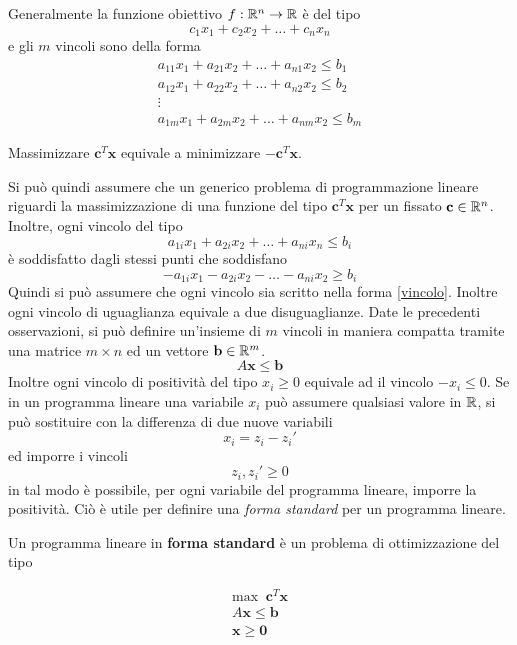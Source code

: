 \documentclass[10pt, letterpaper]{report}
\begin{document}
Generalmente la funzione obiettivo  $f:{\mathbb R}^n\rightarrow {\mathbb R}$ è del tipo 
$$c_1x_1+c_2x_2+\dots+c_nx_n $$
e gli $m$ vincoli sono della forma $$\begin{matrix}
    a_{11}x_1+a_{21}x_2+\dots + a_{n1}x_2\le b_1\\ 
    a_{12}x_1+a_{22}x_2+\dots + a_{n2}x_2\le b_2\\ \vdots \\ 
    a_{1m}x_1+a_{2m}x_2+\dots + a_{nm}x_2\le b_m
\end{matrix}$$
\begin{osservazione}
    Massimizzare  $\mathbf c^T \mathbf x$ equivale a minimizzare $\mathbf -\mathbf c^T\mathbf x $.
\end{osservazione}
Si può quindi assumere che un generico problema di programmazione lineare riguardi la massimizzazione di una funzione del tipo $\mathbf c^T \mathbf x$ per un fissato $\mathbf c \in {\mathbb R}^n$. Inoltre, ogni vincolo del tipo 
\begin{equation}\label{vincolo} a_{1i}x_1+a_{2i}x_2+\dots + a_{ni}x_n\le b_i\end{equation}
è soddisfatto dagli stessi punti che soddisfano 
$$ -a_{1i}x_1-a_{2i}x_2-\dots - a_{ni}x_2\ge b_i $$
Quindi si può assumere che ogni vincolo sia scritto nella forma \ref{vincolo}. Inoltre ogni vincolo di uguaglianza equivale a due disuguaglianze. Date le precedenti osservazioni, si può definire un'insieme di $m$ vincoli in maniera compatta tramite una matrice $m\times n $ ed un vettore $\mathbf b\in {\mathbb R}^m$. 
$$ A\mathbf x \le \mathbf b$$ 
Inoltre ogni vincolo di positività del tipo $x_i\ge 0$ equivale ad il vincolo $-x_i\le 0$. Se in un programma lineare una variabile $x_i$ può assumere qualsiasi valore in ${\mathbb R}$, si può sostituire con la differenza di due nuove variabili 
$$x_i=z_i-z_i' $$
ed imporre i vincoli $$ z_i,z_i'\ge 0$$ 
in tal modo è possibile, per ogni variabile del programma lineare, imporre la positività. Ciò è utile per definire una \textit{forma standard} per un programma lineare. 
\begin{definizione}\label{formaStandard}
    Un programma lineare in \textbf{forma standard} è un problema di ottimizzazione del tipo 
\end{definizione}
    $$
    \begin{matrix}
        \text{max } \ \mathbf c^T\mathbf x\\ 
        A\mathbf x \le \mathbf b\\ 
        \mathbf x \ge \mathbf  0
    \end{matrix}
    $$
\end{document}

